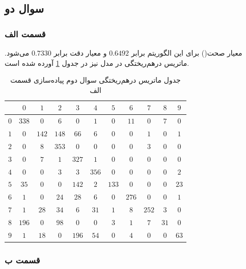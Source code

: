 \documentclass{article}
\begin{document}
\subsection*{سوال دو}

\subsubsection*{قسمت الف}

معیار صحت() برای این الگوریتم برابر $0.6492$ و معیار دقت برابر $0.7330$ می‌شود. ماتریس درهم‌ریختگی در
مدل نیز در جدول \ref{implementation-q2-parta} آورده شده است.

\begin{table}[h]
    \centering
    \caption{جدول ماتریس درهم‌ریختگی سوال دوم پیاده‌سازی قسمت الف}
    \label{implementation-q2-parta}
    \begin{tabular}{c||c|c|c|c|c|c|c|c|c|c}
        & $0$ & $1$ & $2$ & $3$ & $4$ & $5$ & $6$ & $7$ & $8$ & $9$ \\
        \hline\hline
        $0$ & $338$ & $0$ & $6$ & $0$ & $1$ & $0$ & $11$ & $0$ & $7$ & $0$ \\
        \hline
        $1$ & $0$ & $142$ & $148$ & $66$ & $6$ & $0$ & $0$ & $1$ & $0$ & $1$ \\
        \hline
        $2$ & $0$ & $8$ & $353$ & $0$ & $0$ & $0$ & $0$ & $3$ & $0$ & $0$ \\
        \hline
        $3$ & $0$ & $7$ & $1$ & $327$ & $1$ & $0$ & $0$ & $0$ & $0$ & $0$ \\
        \hline
        $4$ & $0$ & $0$ & $3$ & $3$ & $356$ & $0$ & $0$ & $0$ & $0$ & $2$ \\
        \hline
        $5$ & $35$ & $0$ & $0$ & $142$ & $2$ & $133$ & $0$ & $0$ & $0$ & $23$ \\
        \hline
        $6$ & $1$ & $0$ & $24$ & $28$ & $6$ & $0$ & $276$ & $0$ & $0$ & $1$ \\
        \hline
        $7$ & $1$ & $28$ & $34$ & $6$ & $31$ & $1$ & $8$ & $252$ & $3$ & $0$ \\
        \hline
        $8$ & $196$ & $0$ & $98$ & $0$ & $0$ & $3$ & $1$ & $7$ & $31$ & $0$ \\
        \hline
        $9$ & $1$ & $18$ & $0$ & $196$ & $54$ & $0$ & $4$ & $0$ & $0$ & $63$
    \end{tabular}
\end{table}

\subsubsection*{قسمت ب}
\end{document}
